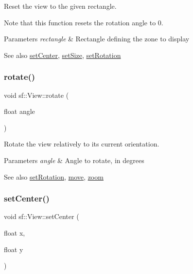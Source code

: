 Reset the view to the given rectangle. 

Note that this function resets the rotation angle to 0.


\begin{DoxyParams}{Parameters}
{\em rectangle} & Rectangle defining the zone to display\\
\hline
\end{DoxyParams}
\begin{DoxySeeAlso}{See also}
\hyperlink{classsf_1_1_view_aa8e3fedb008306ff9811163545fb75f2}{set\+Center}, \hyperlink{classsf_1_1_view_a9525b73fe9fbaceb9568faf56b399dab}{set\+Size}, \hyperlink{classsf_1_1_view_a24d0503c9c51f5ef5918612786d325c1}{set\+Rotation} 
\end{DoxySeeAlso}
\mbox{\label{classsf_1_1_view_a5fd3901aae1845586ca40add94faa378}} 
\subsubsection{\texorpdfstring{rotate()}{rotate()}}
{\footnotesize\ttfamily void sf\+::\+View\+::rotate (\begin{DoxyParamCaption}\item[{float}]{angle }\end{DoxyParamCaption})}



Rotate the view relatively to its current orientation. 


\begin{DoxyParams}{Parameters}
{\em angle} & Angle to rotate, in degrees\\
\hline
\end{DoxyParams}
\begin{DoxySeeAlso}{See also}
\hyperlink{classsf_1_1_view_a24d0503c9c51f5ef5918612786d325c1}{set\+Rotation}, \hyperlink{classsf_1_1_view_a0c82144b837caf812f7cb25a43d80c41}{move}, \hyperlink{classsf_1_1_view_a4a72a360a5792fbe4e99cd6feaf7726e}{zoom} 
\end{DoxySeeAlso}
\mbox{\label{classsf_1_1_view_aa8e3fedb008306ff9811163545fb75f2}} 
\subsubsection{\texorpdfstring{set\+Center()}{setCenter()}\hspace{0.1cm}{\footnotesize\ttfamily [1/2]}}
{\footnotesize\ttfamily void sf\+::\+View\+::set\+Center (\begin{DoxyParamCaption}\item[{float}]{x,  }\item[{float}]{y }\end{DoxyParamCaption})}



